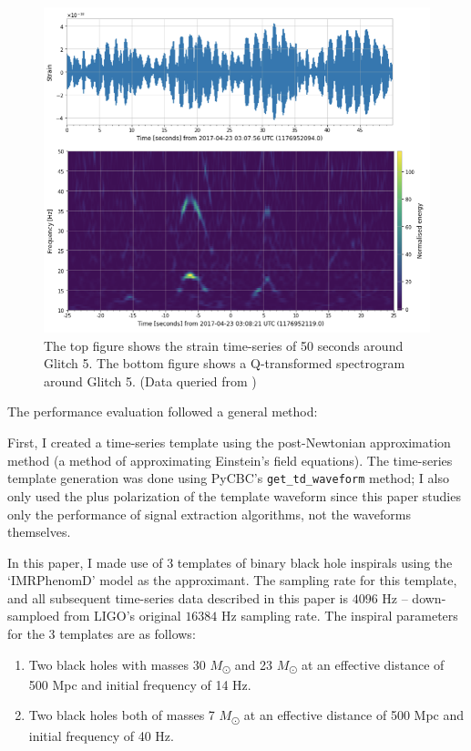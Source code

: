 \documentclass[reprint,
letterpaper,
 amsmath,amssymb,
 aps,
]{revtex4-2}
\def\code#1{\texttt{#1}}
\begin{document}
\begin{figure}[h]
\caption{The top figure shows the strain time-series of 50 seconds around Glitch 5. The bottom figure shows a Q-transformed spectrogram around Glitch 5. (Data queried from \cite{collaboration2019open})}
\includegraphics[scale = .65]{whistle graphics.png}
\centering
\end{figure} 

The performance evaluation followed a general method: 

First, I created a time-series template using the post-Newtonian approximation method (a method of approximating Einstein's field equations). The time-series template generation was done using PyCBC's \code{get\_td\_waveform} method; I also only used the plus polarization of the template waveform since this paper studies only the performance of signal extraction algorithms, not the waveforms themselves. 

In this paper, I made use of 3 templates of binary black hole inspirals using the `IMRPhenomD' model as the approximant. The sampling rate for this template, and all subsequent time-series data described in this paper is $4096$ Hz – down-samploed from LIGO's original $16384$ Hz sampling rate. The inspiral parameters for the 3 templates are as follows:
\begin{enumerate}
    \item Two black holes with masses 30 $M$\textsubscript{\(\odot\)} and 23 $M$\textsubscript{\(\odot\)} at an effective distance of 500 Mpc and initial frequency of 14 Hz.
    \item Two black holes both of masses 7 $M$\textsubscript{\(\odot\)}  at an effective distance of 500 Mpc and initial frequency of 40 Hz.
\end{enumerate}
\end{document}
